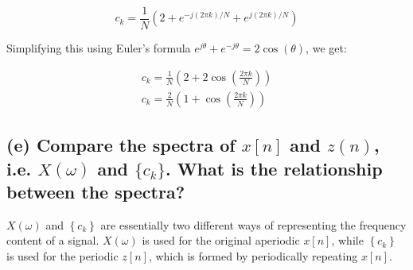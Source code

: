 \begin{equation*}
    c_{k}=\frac{1}{N}\left(2+e^{-j(2 \pi k) / N}+e^{j(2 \pi k) / N}\right)
\end{equation*}

Simplifying this using Euler's formula $ e^{j \theta}+e^{-j \theta}=2 \cos (\theta) $, we get:

\begin{equation*}
    \begin{array}{c}c_{k}=\frac{1}{N}\left(2+2 \cos \left(\frac{2 \pi k}{N}\right)\right) \\c_{k}=\frac{2}{N}\left(1+\cos \left(\frac{2 \pi k}{N}\right)\right)\end{array}
\end{equation*}


\subsection*{(e) Compare the spectra of $x[n]$ and $z(n)$, i.e. $X(\omega)$ and $\{c_k\}$. What is the
relationship between the spectra?}

$ X(\omega) $ and $ \left\{c_{k}\right\} $ are essentially two different ways of representing the frequency content of a signal. $ X(\omega) $ is used for the original aperiodic $ x[n] $, while $ \left\{c_{k}\right\} $ is used for the periodic $ z[n] $, which is formed by periodically repeating $ x[n] $.